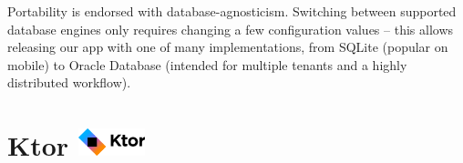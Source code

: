 Portability is endorsed with database-agnosticism. Switching between supported database engines only requires changing a few configuration values -- this allows releasing our app with one of many implementations, from SQLite (popular on mobile) to Oracle Database (intended for multiple tenants and a highly distributed workflow).

\section{Ktor {\hspace{1cm}\includegraphics[height=8mm, keepaspectratio]{images/ktor_logo.png}}}